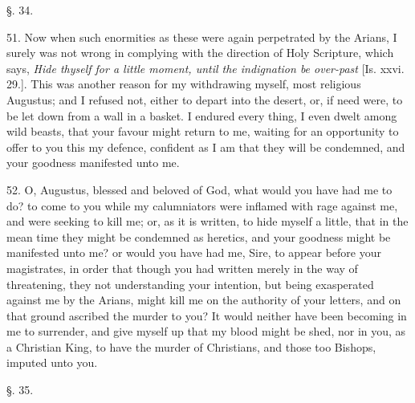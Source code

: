 §. 34.

51. Now when such enormities as these were again perpetrated by the
Arians, I surely was not wrong in complying with the direction of Holy
Scripture, which says, \emph{Hide
thyself for a little moment, until the indignation be over-past} [Is. xxvi. 29.]. This was another reason for my
withdrawing myself, most religious Augustus; and I refused not, either
to depart into the desert, or, if need were, to be let down from a
wall in a basket. I endured every thing, I even dwelt among wild
beasts, that your favour might return to me, waiting for an
opportunity to offer to you this my defence, confident as I am that
they will be condemned, and your goodness manifested unto me.

52. O, Augustus, blessed and beloved of God, what would you have had me
to do? to come to you while my calumniators were inflamed with rage
against me, and were seeking to kill me; or, as it is written, to hide
myself a little, that in the mean time they might be condemned as
heretics, and your goodness might be manifested unto me? or would you
have had me, Sire, to appear before your magistrates, in order that
though you had written merely in the way of threatening, they not
understanding your intention, but being exasperated against me by the
Arians, might kill me on the authority of your letters, and on that
ground ascribed the murder to you? It would neither have been becoming
in me to surrender, and give myself up that my blood might be shed,
nor in you, as a Christian King, to have the murder of Christians, and
those too Bishops, imputed unto you.

§. 35.

